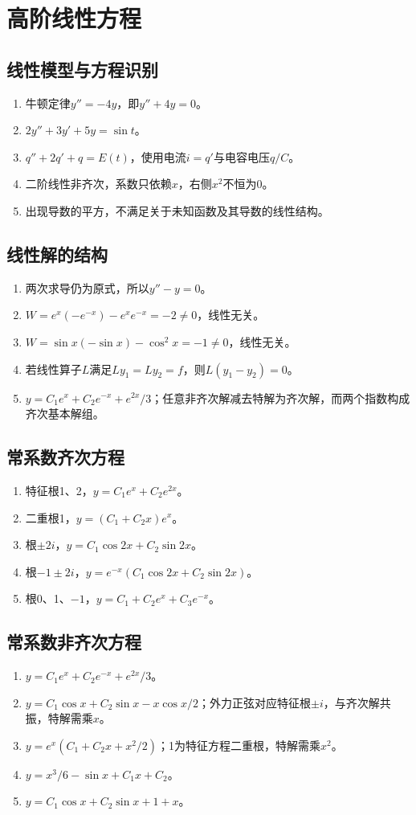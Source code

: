 \documentclass[11pt,a4paper,fontset=fandol]{ctexrep}
\begin{document}
\section{高阶线性方程}
\subsection{线性模型与方程识别}
\begin{enumerate}
\item 牛顿定律$y''=-4y$，即$y''+4y=0$。
\item $2y''+3y'+5y=\sin t$。
\item $q''+2q'+q=E(t)$，使用电流$i=q'$与电容电压$q/C$。
\item 二阶线性非齐次，系数只依赖$x$，右侧$x^2$不恒为0。
\item 出现导数的平方，不满足关于未知函数及其导数的线性结构。
\end{enumerate}
\subsection{线性解的结构}
\begin{enumerate}
\item 两次求导仍为原式，所以$y''-y=0$。
\item $W=e^x(-e^{-x})-e^xe^{-x}=-2\ne0$，线性无关。
\item $W=\sin x(-\sin x)-\cos^2x=-1\ne0$，线性无关。
\item 若线性算子$L$满足$Ly_1=Ly_2=f$，则$L(y_1-y_2)=0$。
\item $y=C_1e^x+C_2e^{-x}+e^{2x}/3$；任意非齐次解减去特解为齐次解，而两个指数构成齐次基本解组。
\end{enumerate}
\subsection{常系数齐次方程}
\begin{enumerate}
\item 特征根1、2，$y=C_1e^x+C_2e^{2x}$。
\item 二重根1，$y=(C_1+C_2x)e^x$。
\item 根$\pm2i$，$y=C_1\cos2x+C_2\sin2x$。
\item 根$-1\pm2i$，$y=e^{-x}(C_1\cos2x+C_2\sin2x)$。
\item 根0、1、$-1$，$y=C_1+C_2e^x+C_3e^{-x}$。
\end{enumerate}
\subsection{常系数非齐次方程}
\begin{enumerate}
\item $y=C_1e^x+C_2e^{-x}+e^{2x}/3$。
\item $y=C_1\cos x+C_2\sin x-x\cos x/2$；外力正弦对应特征根$\pm i$，与齐次解共振，特解需乘$x$。
\item $y=e^x(C_1+C_2x+x^2/2)$；1为特征方程二重根，特解需乘$x^2$。
\item $y=x^3/6-\sin x+C_1x+C_2$。
\item $y=C_1\cos x+C_2\sin x+1+x$。
\end{enumerate}
\end{document}
